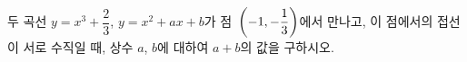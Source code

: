 두 곡선 $y=x^3+\dfrac{2}{3}$, $y=x^2+ax+b$가 점~$\left(-1{,}\mkern3mu\mathopen{}-\dfrac{1}{3}\right)$에서 만나고, 이 점에서의 접선이 서로 수직일 때, 상수 $a$, $b$에 대하여 $a+b$의 값을 구하시오.
